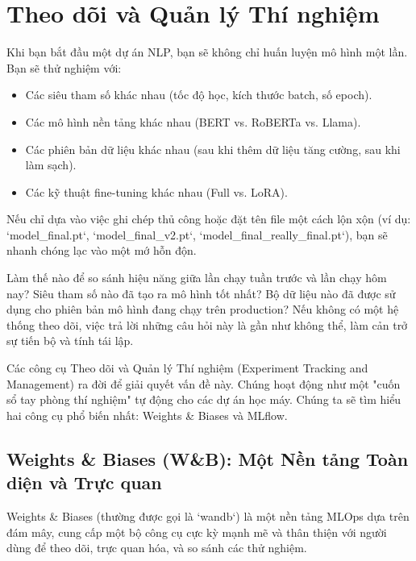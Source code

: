 
\section{Theo dõi và Quản lý Thí nghiệm}
\label{sec:experiment_tracking}

Khi bạn bắt đầu một dự án NLP, bạn sẽ không chỉ huấn luyện mô hình một lần. Bạn sẽ thử nghiệm với:
\begin{itemize}
    \item Các siêu tham số khác nhau (tốc độ học, kích thước batch, số epoch).
    \item Các mô hình nền tảng khác nhau (BERT vs. RoBERTa vs. Llama).
    \item Các phiên bản dữ liệu khác nhau (sau khi thêm dữ liệu tăng cường, sau khi làm sạch).
    \item Các kỹ thuật fine-tuning khác nhau (Full vs. LoRA).
\end{itemize}

Nếu chỉ dựa vào việc ghi chép thủ công hoặc đặt tên file một cách lộn xộn (ví dụ: `model\_final.pt`, `model\_final\_v2.pt`, `model\_final\_really\_final.pt`), bạn sẽ nhanh chóng lạc vào một mớ hỗn độn.

\begin{tcolorbox}[
    title=Vấn đề: "Mớ hỗn độn của Thí nghiệm",
    colback=red!5!white, colframe=red!75!black, fonttitle=\bfseries
]
Làm thế nào để so sánh hiệu năng giữa lần chạy tuần trước và lần chạy hôm nay? Siêu tham số nào đã tạo ra mô hình tốt nhất? Bộ dữ liệu nào đã được sử dụng cho phiên bản mô hình đang chạy trên production? Nếu không có một hệ thống theo dõi, việc trả lời những câu hỏi này là gần như không thể, làm cản trở sự tiến bộ và tính tái lập.
\end{tcolorbox}

Các công cụ Theo dõi và Quản lý Thí nghiệm (Experiment Tracking and Management) ra đời để giải quyết vấn đề này. Chúng hoạt động như một "cuốn sổ tay phòng thí nghiệm" tự động cho các dự án học máy. Chúng ta sẽ tìm hiểu hai công cụ phổ biến nhất: Weights \& Biases và MLflow.

\subsection{Weights \& Biases (W\&B): Một Nền tảng Toàn diện và Trực quan}
\label{ssec:wandb}
Weights \& Biases (thường được gọi là `wandb`) là một nền tảng MLOps dựa trên đám mây, cung cấp một bộ công cụ cực kỳ mạnh mẽ và thân thiện với người dùng để theo dõi, trực quan hóa, và so sánh các thử nghiệm.

